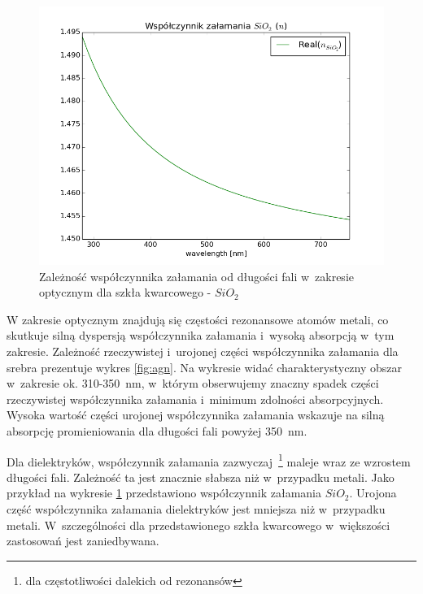 \begin{figure}[htb]
	\includegraphics[width=\textwidth]{images/sio2n.png}
	\caption{Zależność współczynnika załamania od długości fali w~zakresie optycznym dla szkła kwarcowego -  $SiO_2$~\cite{MALITSON:65}   }
	\label{fig:sio2n}
\end{figure}
W zakresie optycznym znajdują się częstości rezonansowe atomów metali, co skutkuje silną dyspersją współczynnika załamania i~wysoką absorpcją w~tym zakresie. Zależność rzeczywistej i~urojonej części współczynnika załamania  dla srebra prezentuje wykres \ref{fig:agn}. Na wykresie widać charakterystyczny obszar w~zakresie ok. 310-350~nm, w~którym obserwujemy znaczny spadek części rzeczywistej współczynnika załamania i~minimum zdolności absorpcyjnych. Wysoka wartość części urojonej współczynnika załamania wskazuje na silną absorpcję promieniowania dla długości fali powyżej 350~nm.

Dla dielektryków, współczynnik załamania zazwyczaj~\footnote{dla częstotliwości dalekich od rezonansów} maleje wraz ze wzrostem długości fali. Zależność ta jest znacznie słabsza niż w~przypadku metali. Jako przykład na wykresie \ref{fig:sio2n} przedstawiono współczynnik załamania $SiO_2$. Urojona część współczynnika załamania dielektryków jest mniejsza niż w~przypadku metali. W~szczególności dla przedstawionego szkła kwarcowego w~większości zastosowań jest zaniedbywana.

